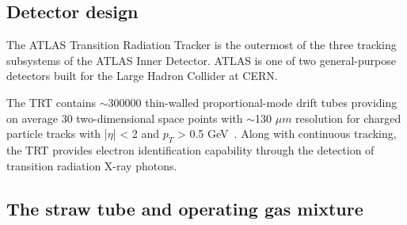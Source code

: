 \subsection{Detector design}
\label{subsec:trt_description}


The ATLAS Transition Radiation Tracker is the outermost of the three tracking subsystems of the ATLAS Inner Detector. 
ATLAS is one of two general-purpose detectors built for the Large Hadron Collider at CERN.

The TRT contains $\sim$300000 thin-walled proportional-mode drift tubes providing on average 30 two-dimensional 
space points with $\sim$130 $\mu m$ resolution for charged particle tracks with |$\eta$| < 2 and $p_T$ > 0.5 GeV~\cite{Abat:2008zza,Abat:2008zzb,Abat:2008zz}.
Along with continuous tracking, the TRT provides electron identification capability through the detection of transition radiation X-ray photons.




\subsection{The straw tube and operating gas mixture}

